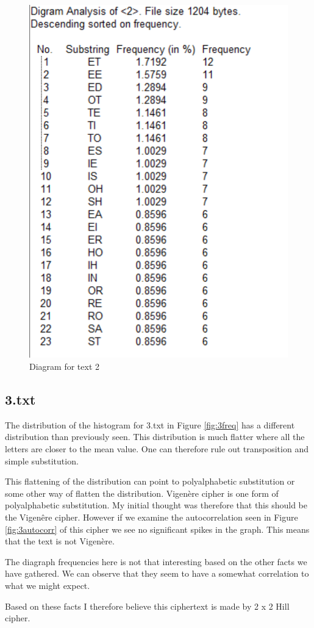 \begin{figure}[ht!]
    \begin{center}
        \includegraphics[height=0.7\textwidth]{assets/2_diagram.png}
        \caption{Diagram for text 2}
        \label{fig:2diagram}
    \end{center}
\end{figure}

\newpage
\subsection*{3.txt}

The distribution of the histogram for 3.txt in Figure \ref{fig:3freq} has a different distribution than previously seen.
This distribution is much flatter where all the letters are closer to the mean value.
One can therefore rule out transposition and simple substitution.

This flattening of the distribution can point to polyalphabetic substitution or some other way of flatten the distribution.
Vigenère cipher is one form of polyalphabetic substitution.
My initial thought was therefore that this should be the Vigenêre cipher.
However if we examine the autocorrelation seen in Figure \ref{fig:3autocorr} of this cipher we see no significant spikes in the graph.
This means that the text is not Vigenère.

The diagraph frequencies here is not that interesting based on the other facts we have gathered.
We can observe that they seem to have a somewhat correlation to what we might expect.

Based on these facts I therefore believe this ciphertext is made by 2 x 2 Hill cipher.

